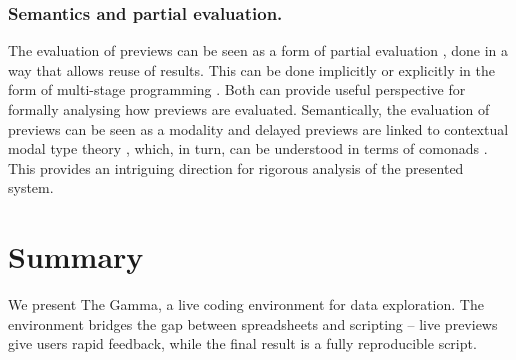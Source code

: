 \documentclass[acmsmall,anonymous,fleqn]{acmart}\settopmatter{printfolios=false,printccs=false,printacmref=false}
\theoremstyle{plain}
\theoremstyle{definition}
\begin{document}
\subsubsection*{Semantics and partial evaluation.}
The evaluation of previews can be seen as a form of partial evaluation \cite{partial}, done in a
way that allows reuse of results. This can be done implicitly or explicitly in the form of
multi-stage programming \cite{metaml}. Both can provide useful perspective for formally analysing
how previews are evaluated. Semantically, the evaluation of previews can be seen as a modality
\cite{modal} and delayed previews are linked to contextual modal type theory \cite{cmtt}, which,
in turn, can be understood in terms of comonads \cite{cmtt-denotation}. This provides an intriguing
direction for rigorous analysis of the presented system.









%
%
%
%
%
%
%
%
%
%
%
%
%
\section{Summary}
We present The Gamma, a live coding environment for data exploration. The environment
bridges the gap between spreadsheets and scripting -- live previews give users rapid feedback,
while the final result is a fully reproducible script.
\end{document}
